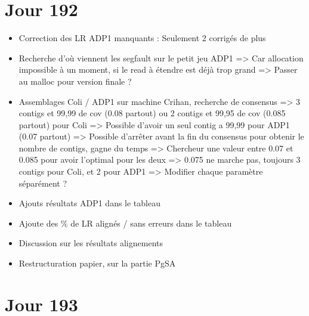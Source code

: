 \documentclass[12pt]{report}
\begin{document}
\section{Jour 192}

\begin{itemize}
	\item Correction des LR ADP1 manquants : Seulement 2 corrigés de plus
	
	\item Recherche d'où viennent les segfault sur le petit jeu ADP1 => Car allocation impossible à un moment,
		  si le read à étendre est déjà trop grand => Passer au malloc pour version finale ?
	
	\item Assemblages Coli / ADP1 sur machine Crihan, recherche de consensus
		  => 3 contigs et 99,99 de cov (0.08 partout) ou 2 contigs et 99,95 de cov (0.085 partout) pour Coli
		  => Possible d'avoir un seul contig a 99,99 pour ADP1 (0.07 partout)
		  => Possible d'arrêter avant la fin du consensus pour obtenir le nombre de contigs, gagne du temps
		  => Chercheur une valeur entre 0.07 et 0.085 pour avoir l'optimal pour les deux 
		  	=> 0.075 ne marche pas, toujours 3 contigs pour Coli, et 2 pour ADP1 => Modifier chaque paramètre séparément ?
		  
	\item Ajouts résultats ADP1 dans le tableau
	
	\item Ajoute des \% de LR alignés / sans erreurs dans le tableau
	
	\item Discussion sur les résultats alignements
	
	\item Restructuration papier, sur la partie PgSA
\end{itemize}

\section{Jour 193}
\end{document}
